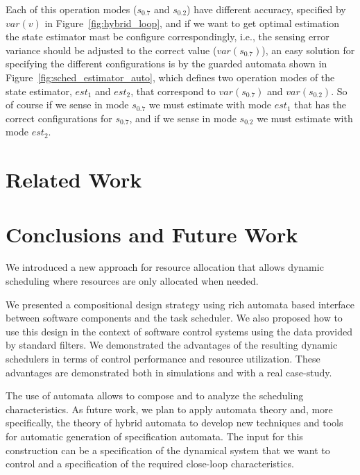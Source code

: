 \documentclass[ twoside, 12pt ]{article}
\begin{document}
{Each of this operation modes ($s_{0.7}$ and $s_{0.2}$) have different accuracy, specified by $var(v)$ in Figure~\ref{fig:hybrid_loop}, and if we want to get optimal estimation the state estimator mast be configure correspondingly, i.e., the sensing error variance should be adjusted to the correct value ($var(s_{0.7})$), an easy solution for specifying the different configurations is by the guarded automata shown in Figure~\ref{fig:sched_estimator_auto}, which defines two operation modes of the state estimator, $est_1$ and $est_2$, that correspond to $var(s_{0.7})$ and $var(s_{0.2})$. So of course if we sense in mode $s_{0.7}$ we must estimate with mode $est_1$ that has the correct configurations for $s_{0.7}$, and if we sense in mode $s_{0.2}$ we must estimate with mode $est_2$.    
}



\section{Related Work}

\section{Conclusions and Future Work}

We introduced a new approach for resource allocation that allows dynamic scheduling where resources are only allocated when needed.

We presented a compositional design strategy using rich automata based interface between software components and the task scheduler. We also proposed how to use this design in the context of software control systems using the data provided by standard filters.
We demonstrated the advantages of the resulting dynamic schedulers in terms of control performance and resource utilization. These advantages are demonstrated both in simulations and with a real case-study.

The use of automata allows to compose and to analyze the scheduling characteristics. As future work, we plan to apply automata theory and, more specifically, the theory of hybrid automata to develop new techniques and tools for automatic generation of specification automata. The input for this construction can be a specification of the dynamical system that we want to control and a specification of the required close-loop characteristics. 
\end{document}
